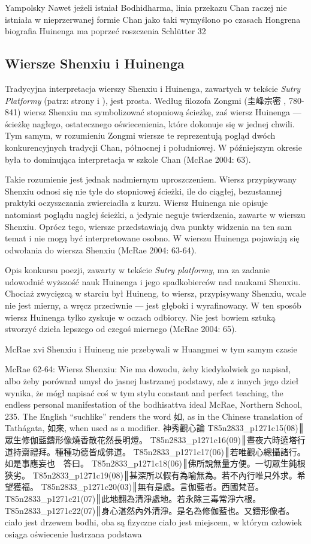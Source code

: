 Yampolsky
Nawet jeżeli istniał Bodhidharma, linia przekazu Chan raczej nie istniała w nieprzerwanej formie
Chan jako taki wymyślono po czasach Hongrena
biografia Huinenga ma poprzeć roszczenia
Schlütter 32
\fi

\subsection{Wiersze Shenxiu i Huinenga}
Tradycyjna interpretacja wierszy Shenxiu i Huinenga, zawartych w tekście \textit{Sutry Platformy} (patrz: strony \pageref{ShenxiuVerse} i \pageref{HuinengVerse}), jest prosta. Według filozofa Zongmi (圭峰宗密 , 780-841) wiersz Shenxiu ma symbolizować stopniową ścieżkę, zaś wiersz Huinenga --- ścieżkę nagłego, ostatecznego oświecenienia, które dokonuje się w jednej chwili. Tym samym, w rozumieniu Zongmi wiersze te reprezentują pogląd dwóch konkurencyjnych tradycji Chan, północnej i południowej. W późniejszym okresie była to dominująca interpretacja w szkole Chan (McRae 2004: 63).

Takie rozumienie jest jednak nadmiernym uproszczeniem. Wiersz przypisywany Shenxiu odnosi się nie tyle do stopniowej ścieżki, ile do ciągłej, bezustannej praktyki oczyszczania zwierciadła z kurzu. Wiersz Huinenga nie opisuje natomiast poglądu nagłej ścieżki, a jedynie neguje twierdzenia, zawarte w wierszu Shenxiu. Oprócz tego, wiersze przedstawiają dwa punkty widzenia na ten sam temat i nie mogą być interpretowane osobno. W wierszu Huinenga pojawiają się odwołania do wiersza Shenxiu (McRae 2004: 63-64).

Opis konkursu poezji, zawarty w tekście \textit{Sutry platformy}, ma za zadanie udowodnić wyższość nauk Huinenga i jego spadkobierców nad naukami Shenxiu. Chociaż zwycięzcą w starciu był Huineng, to wiersz, przypisywany Shenxiu, wcale nie jest mierny, a wręcz przeciwnie --- jest głęboki i wyrafinowany. W ten sposób wiersz Huinenga tylko zyskuje w oczach odbiorcy. Nie jest bowiem sztuką stworzyć dzieła lepszego od czegoś miernego (McRae 2004: 65).

McRae xvi
Shenxiu i Huineng nie przebywali w Huangmei w tym samym czasie

McRae 62-64:
Wiersz Shenxiu:
Nie ma dowodu, żeby kiedykolwiek go napisał, albo żeby porównał umysł do jasnej lustrzanej podstawy, ale z innych jego dzieł wynika, że mógł napisać coś w tym stylu
constant and perfect teaching, the endless personal manifestation of the
bodhisattva ideal
McRae, Northern School, 235. The English “suchlike'' renders the word 如, as in the Chinese translation of Tathágata, 如來, when used as a modifier.
神秀觀心論
T85n2833_p1271c15(08)║眾生修伽藍鑄形像燒香散花然長明燈。
T85n2833_p1271c16(09)║晝夜六時遶塔行道持齋禮拜。種種功德皆成佛道。
T85n2833_p1271c17(06)║若唯觀心總攝諸行。如是事應妄也　答曰。
T85n2833_p1271c18(06)║佛所說無量方便。一切眾生鈍根狹劣。
T85n2833_p1271c19(08)║甚深所以假有為喻無為。若不內行唯只外求。希望獲福。
T85n2833_p1271c20(03)║無有是處。言伽藍者。西國梵音。
T85n2833_p1271c21(07)║此地翻為清淨處地。若永除三毒常淨六根。
T85n2833_p1271c22(07)║身心湛然內外清淨。是名為修伽藍也。又鑄形像者。
ciało jest drzewem bodhi, oba są fizyczne
ciało jest miejscem, w którym człowiek osiąga oświecenie
lustrzana podstawa

